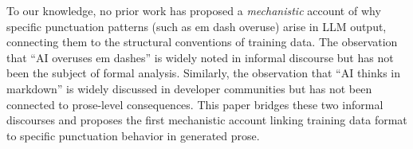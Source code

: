 To our knowledge, no prior work has proposed a \textit{mechanistic} account of why specific punctuation patterns (such as em dash overuse) arise in LLM output, connecting them to the structural conventions of training data. The observation that ``AI overuses em dashes'' is widely noted in informal discourse but has not been the subject of formal analysis. Similarly, the observation that ``AI thinks in markdown'' is widely discussed in developer communities but has not been connected to prose-level consequences. This paper bridges these two informal discourses and proposes the first mechanistic account linking training data format to specific punctuation behavior in generated prose.
